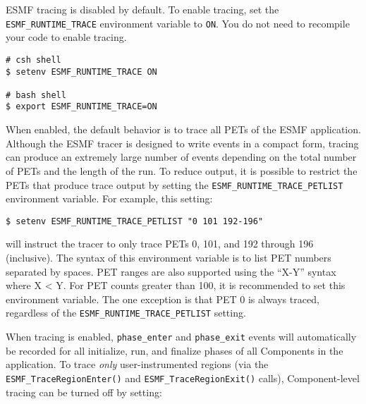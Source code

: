 %


ESMF tracing is disabled by default. To enable tracing, set the
{\tt ESMF\_RUNTIME\_TRACE} environment variable to {\tt ON}. You
do not need to recompile your code to enable tracing.

\begin{verbatim}
# csh shell
$ setenv ESMF_RUNTIME_TRACE ON

# bash shell
$ export ESMF_RUNTIME_TRACE=ON
\end{verbatim}

When enabled, the default behavior is to trace all PETs of the
ESMF application. Although the ESMF tracer is designed to write 
events in a compact form, tracing can produce an extremely
large number of events depending on the total number of PETs and
the length of the run. To reduce output, it is possible to restrict
the PETs that produce trace output by setting the {\tt ESMF\_RUNTIME\_TRACE\_PETLIST}
environment variable. For example, this setting:

\begin{verbatim}
$ setenv ESMF_RUNTIME_TRACE_PETLIST "0 101 192-196"
\end{verbatim}

will instruct the tracer to only trace PETs 0, 101, and 192 through 196
(inclusive). The syntax of this environment variable is to list
PET numbers separated by spaces. PET ranges are also supported using
the ``X-Y'' syntax where X < Y. For PET counts greater than 100, it is
recommended to set this environment variable. The one exception is that
PET 0 is always traced, regardless of the {\tt ESMF\_RUNTIME\_TRACE\_PETLIST}
setting.

When tracing is enabled, {\tt phase\_enter} and {\tt phase\_exit} events will
automatically be recorded for all initialize, run, and finalize phases of all
Components in the application. To trace {\em only} user-instrumented regions (via
the {\tt ESMF\_TraceRegionEnter()} and {\tt ESMF\_TraceRegionExit()} calls),
Component-level tracing can be turned off by setting:

